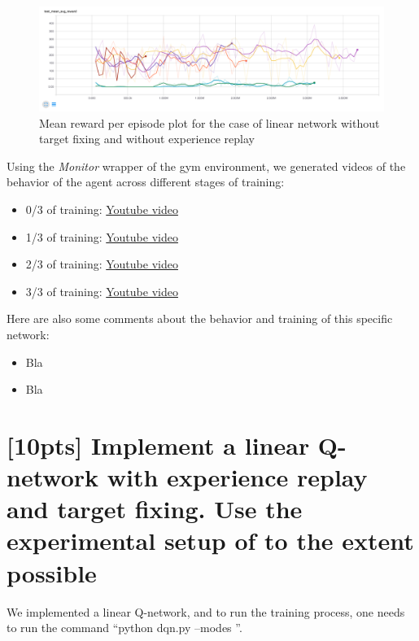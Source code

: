 \documentclass{article}
\begin{document}
\begin{figure}[ht] \label{fig:r_q2}
  \centering
  \includegraphics[width=1.0\textwidth]{images/r_linearWithoutStuff}
  \caption{Mean reward per episode plot for the case of linear network without target fixing and without experience replay}
\end{figure}

Using the \textit{Monitor} wrapper of the gym environment, we generated videos of the behavior of the agent across different stages of training:

\begin{itemize}
  \item 0/3 of training: \href{http://www.sharelatex.com}{Youtube video}
  \item 1/3 of training: \href{http://www.sharelatex.com}{Youtube video}
  \item 2/3 of training: \href{http://www.sharelatex.com}{Youtube video}
  \item 3/3 of training: \href{http://www.sharelatex.com}{Youtube video}
\end{itemize}

Here are also some comments about the behavior and training of this specific network:

\begin{itemize}
  \item Bla
  \item Bla
\end{itemize}


\section{[10pts] Implement a linear Q-network with experience replay and target fixing. Use the experimental setup of \cite{mnih2013playing,mnih2015human} to the extent possible}

We implemented a linear Q-network, and to run the training process, one needs to run the command ``python dqn.py --modes ''.
\end{document}
